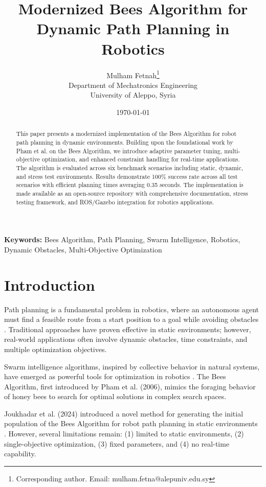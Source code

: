 \documentclass[12pt]{article}
\title{Modernized Bees Algorithm for Dynamic Path Planning in Robotics}
\author{
Mulham Fetnah\thanks{Corresponding author. Email: mulham.fetna@alepuniv.edu.sy}\\
Department of Mechatronics Engineering\\
University of Aleppo, Syria
}
\date{\today}
\begin{document}
\maketitle

\begin{abstract}
This paper presents a modernized implementation of the Bees Algorithm for robot path planning in dynamic environments. Building upon the foundational work by Pham et al. on the Bees Algorithm, we introduce adaptive parameter tuning, multi-objective optimization, and enhanced constraint handling for real-time applications. The algorithm is evaluated across six benchmark scenarios including static, dynamic, and stress test environments. Results demonstrate 100\% success rate across all test scenarios with efficient planning times averaging 0.35 seconds. The implementation is made available as an open-source repository with comprehensive documentation, stress testing framework, and ROS/Gazebo integration for robotics applications.
\end{abstract}

\bigskip

\noindent\textbf{Keywords:} Bees Algorithm, Path Planning, Swarm Intelligence, Robotics, Dynamic Obstacles, Multi-Objective Optimization

\bigskip

\section{Introduction}

Path planning is a fundamental problem in robotics, where an autonomous agent must find a feasible route from a start position to a goal while avoiding obstacles \cite{hart1968,lavalle1998,kavraki1996}. Traditional approaches have proven effective in static environments; however, real-world applications often involve dynamic obstacles, time constraints, and multiple optimization objectives.

Swarm intelligence algorithms, inspired by collective behavior in natural systems, have emerged as powerful tools for optimization in robotics \cite{pham2006}. The Bees Algorithm, first introduced by Pham et al. (2006), mimics the foraging behavior of honey bees to search for optimal solutions in complex search spaces.

Joukhadar et al. (2024) introduced a novel method for generating the initial population of the Bees Algorithm for robot path planning in static environments \cite{joukhadar2024}. However, several limitations remain: (1) limited to static environments, (2) single-objective optimization, (3) fixed parameters, and (4) no real-time capability.
\end{document}
